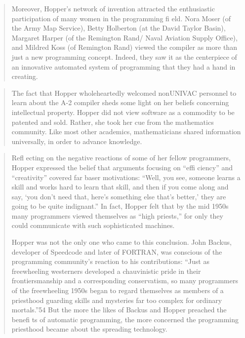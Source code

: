 \begin{quotation}
Moreover, Hopper’s network of invention attracted the enthusiastic participation of many women in the programming fi eld.
Nora Moser (of the Army Map Service), Betty Holberton (at the
David Taylor Basin), Margaret Harper (of the Remington Rand/
Naval Aviation Supply Office), and Mildred Koss (of Remington
Rand) viewed the compiler as more than just a new programming concept. Indeed, they saw it as the centerpiece of an innovative automated system of programming that they had a hand
in creating.
\end{quotation}
\begin{quotation}
The fact that Hopper wholeheartedly welcomed nonUNIVAC personnel to learn about the A-2 compiler sheds some
light on her beliefs concerning intellectual property. Hopper did
not view software as a commodity to be patented and sold.
Rather, she took her cue from the mathematics community. Like
most other academics, mathematicians shared information universally, in order to advance knowledge.
\end{quotation}
\begin{quotation}
Refl ecting on the negative reactions of some of her fellow
programmers, Hopper expressed the belief that arguments focusing on “effi ciency” and “creativity” covered far baser motivations:
“Well, you see, someone learns a skill and works hard to learn
that skill, and then if you come along and say, ‘you don’t need
that, here’s something else that’s better,’ they are going to be quite
indignant.” In fact, Hopper felt that by the mid 1950s many
programmers viewed themselves as “high priests,” for only they
could communicate with such sophisticated machines.

Hopper was not the only one who came to this conclusion.
John Backus, developer of Speedcode and later of FORTRAN,
was conscious of the programming community’s reaction to his
contributions: “Just as freewheeling westerners developed a chauvinistic pride in their frontiersmanship and a corresponding conservatism, so many programmers of the freewheeling 1950s began
to regard themselves as members of a priesthood guarding skills
and mysteries far too complex for ordinary mortals.”54 But the
more the likes of Backus and Hopper preached the benefi ts of
automatic programming, the more concerned the programming
priesthood became about the spreading technology.
\end{quotation}


